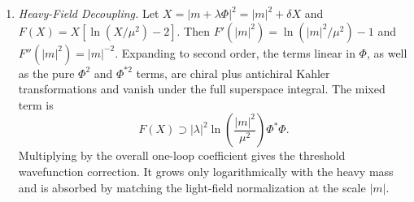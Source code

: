 \begin{enumerate}
\begin{enumerate}
      \(\dd^4x\,\dd^4\theta\) has dimension \(-2\), producing a dimensionless
      action as required.
    \item \emph{Heavy-Field Decoupling.}
    Let \(X=|m+\lambda\Phi|^2=|m|^2+\delta X\) and
      \(F(X)=X[\ln(X/\mu^2)-2]\).  Then
      \(F'(|m|^2)=\ln(|m|^2/\mu^2)-1\) and
      \(F''(|m|^2)=|m|^{-2}\).  Expanding to second order, the terms linear
      in \(\Phi\), as well as the pure \(\Phi^2\) and \(\Phi^{*2}\) terms,
      are chiral plus antichiral Kahler transformations and vanish under
      the full superspace integral.  The mixed term is
      \[
        F(X)\supset
          |\lambda|^2
          \ln\!\left(\frac{|m|^2}{\mu^2}\right)\Phi^*\Phi .
      \]
      Multiplying by the overall one-loop coefficient gives the threshold
      wavefunction correction.  It grows only logarithmically with the
      heavy mass and is absorbed by matching the light-field normalization
      at the scale \(|m|\).
  \end{enumerate}

\end{enumerate}
